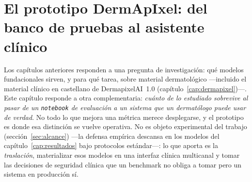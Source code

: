 %

\chapter{El prototipo DermApIxel: del banco de pruebas al asistente clínico}
\label{cap:prototipo}

Los capítulos anteriores responden a una pregunta de investigación: qué
modelos fundacionales sirven, y para qué tarea, sobre material
dermatológico ---incluido el material clínico en castellano de
DermapixelAI~1.0 (capítulo~\ref{cap:dermapixel})---. Este capítulo responde
a otra complementaria: \emph{cuánto de lo estudiado sobrevive al pasar de
un \texttt{notebook} de evaluación a un sistema que un dermatólogo puede
usar de verdad}. No todo lo que mejora una métrica merece desplegarse, y el
prototipo es donde esa distinción se vuelve operativa. No es objeto
experimental del trabajo (sección~\ref{sec:alcance}) ---la defensa empírica
descansa en los modelos del capítulo~\ref{cap:resultados} bajo protocolos
estándar---: lo que aporta es la \emph{traslación}, materializar esos
modelos en una interfaz clínica multicanal y tomar las decisiones de
seguridad clínica que un benchmark no obliga a tomar pero un sistema en
producción sí.

